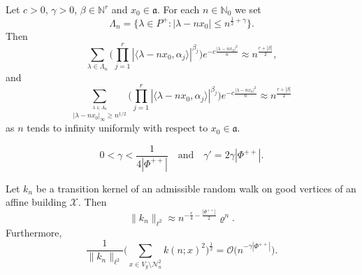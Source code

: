 \documentclass[10pt,a4paper]{amsart}
\newcommand{\NN}{\mathbb{N}}
\newcommand{\calO}{\mathcal{O}}
\newcommand{\norm}[1]{\lvert {#1} \rvert}
\newcommand{\scrN}{\mathscr{N}}
\newcommand{\scrX}{\mathscr{X}}
\newcommand{\sprod}[2]{\langle {#1}, {#2} \rangle}
\begin{document}
\begin{lemma}
	\label{lem:1}
	Let $c > 0$, $\gamma > 0$, $\beta \in \NN^r$ and $x_0 \in \mathfrak{a}$. For each $n \in \NN_0$ we set
	\[
		\Lambda_n = \Big\{\lambda \in P^+ : \norm{\lambda - n x_0} \leqslant n^{\frac{1}{2}+\gamma}\Big\}.
	\]
	Then
	\begin{equation}
		\label{eq:23}
		\sum_{\lambda \in \Lambda_n}
		\Big(\prod_{j = 1}^r |\sprod{\lambda - n x_0}{\alpha_j}|^{\beta_j} \Big)
		e^{-c \frac{\norm{\lambda - n x_0}^2}{n} }
		\approx n^{\frac{r+|\beta|}{2}},
	\end{equation}
	and
	\begin{equation}
		\label{eq:24}
		\sum_{\stackrel{\lambda \in \Lambda_n}{|\lambda - n x_0|_\infty \geqslant n^{1/2}}}
		\Big(\prod_{j = 1}^r |\sprod{\lambda - n x_0}{\alpha_j}|^{\beta_j} \Big)
		e^{-c \frac{\norm{\lambda - n x_0}^2}{n} }
		\approx n^{\frac{r+|\beta|}{2}}
	\end{equation}
	as $n$ tends to infinity uniformly with respect to $x_0 \in \mathfrak{a}$.
\end{lemma}

\begin{equation}
	\label{eq:38}
	0 < \gamma < \frac{1}{4|\Phi^{++}|}
	\quad\text{and}\quad
	\gamma' = 2 \gamma |\Phi^{++}|.
\end{equation} 

\begin{theorem}
	\label{thm:2}
	Let $k_n$ be a transition kernel of an admissible random walk on good vertices of an affine building $\scrX$.
	Then
	\[
		\|k_n \|_{\ell^2}
		\approx 
		n^{-\frac{r}{4}-\frac{|\Phi^{++}|}{2}} \varrho^{n}.
	\]
	Furthermore,
	\[
		\frac{1}{\| k_n\|_{\ell^2}}
		\bigg( \sum_{x \in V_g \setminus \scrN_n^2} k(n; x)^2 \bigg)^\frac{1}{2} = 
		\calO\Big(n^{-\gamma|\Phi^{++}|}\Big).
	\]
\end{theorem}
\end{document}

